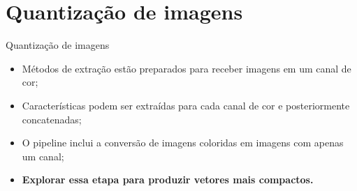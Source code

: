 \documentclass[10pt]{beamer}
\begin{document}
\section{Quantização de imagens}
\begin{frame}{Quantização de imagens}
  \setlength\leftmargini{1em}
  \begin{block}{}
        \begin{itemize}
      \item Métodos de extração estão preparados para receber imagens em um canal de cor;
      \item Características podem ser extraídas para cada canal de cor e posteriormente concatenadas;
      \item O pipeline inclui a conversão de imagens coloridas em imagens com apenas um canal;
      \item \textbf{Explorar essa etapa para produzir vetores mais compactos.}
    \end{itemize}
  \end{block}
\end{frame}
\end{document}
